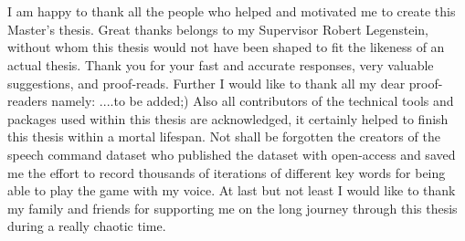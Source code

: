 
\chapter*{}
I am happy to thank all the people who helped and motivated me to create this Master's thesis.
Great thanks belongs to my Supervisor Robert Legenstein, without whom this thesis would not have been shaped to fit the likeness of an actual thesis.
Thank you for your fast and accurate responses, very valuable suggestions, and proof-reads.
Further I would like to thank all my dear proof-readers namely: ....to be added;)
Also all contributors of the technical tools and packages used within this thesis are acknowledged, it certainly helped to finish this thesis within a mortal lifespan.
Not shall be forgotten the creators of the speech command dataset who published the dataset with open-access and saved me the effort to record thousands of iterations of different key words for being able to play the game with my voice.
At last but not least I would like to thank my family and friends for supporting me on the long journey through this thesis during a really chaotic time.